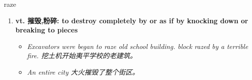 
\begin{frame}
{\huge raze}
\begin{center}
\begin{enumerate}\Large
  \item \textbf{vt. 摧毁,粉碎: to destroy completely by or as if by knocking down or breaking to pieces}
  \begin{itemize}
    \item \em{\Large{Excavators were began to raze old school building. block razed by a terrible fire. 挖土机开始夷平学校的老建筑。}}
    \item \em{\Large{An entire city 大火摧毁了整个街区。}}
  \end{itemize}
\end{enumerate}
\end{center}
\end{frame}
